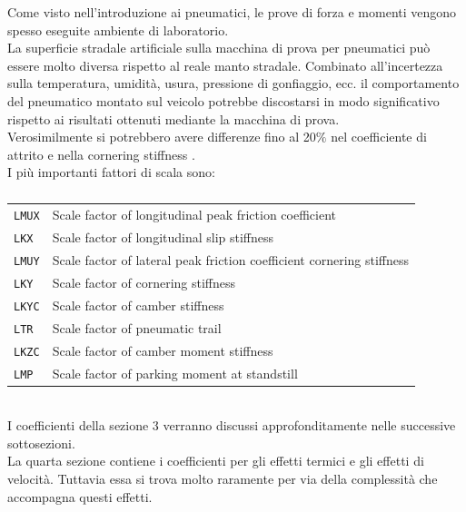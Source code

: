 Come visto nell'introduzione ai pneumatici, le prove di forza e momenti vengono spesso eseguite ambiente di laboratorio.\\ 
La superficie stradale artificiale sulla macchina di prova per pneumatici può essere molto diversa rispetto al reale manto stradale.
Combinato all'incertezza sulla temperatura, umidità, usura, pressione di gonfiaggio, ecc. il comportamento del pneumatico montato sul veicolo potrebbe discostarsi in modo significativo rispetto ai risultati ottenuti mediante la macchina di prova.\\
Verosimilmente si potrebbero avere differenze fino al 20$\%$ nel coefficiente di attrito e nella cornering stiffness \cite{Braghin2006EnvironmentalEO}.\\
I più importanti fattori di scala sono:\\
\begin{table}[h!] 
    {\scriptsize\setlength\itemsep{-0.2em}
    \centering
    \begin{tabular}{l l}
        \texttt{LMUX} \qquad \quad  & Scale factor of longitudinal peak friction coefficient\\
        \texttt{LKX} & Scale factor of longitudinal slip stiffness\\
        \texttt{LMUY} & Scale factor of lateral peak friction coefficient cornering stiffness\\
        \texttt{LKY} & Scale factor of cornering stiffness\\
        \texttt{LKYC} & Scale factor of camber stiffness\\
        \texttt{LTR} & Scale factor of pneumatic trail\\
        \texttt{LKZC} & Scale factor of camber moment stiffness\\
        \texttt{LMP} & Scale factor of parking moment at standstill\\
    \end{tabular}

    }
    \caption{}
    \label{tab:scaling factors}
\end{table}
\\
I coefficienti della sezione 3 verranno discussi 
approfonditamente nelle successive sottosezioni.\\
La quarta sezione contiene i coefficienti per gli effetti termici e gli effetti di velocità.
Tuttavia essa si trova molto raramente per via della complessità che accompagna questi effetti.

